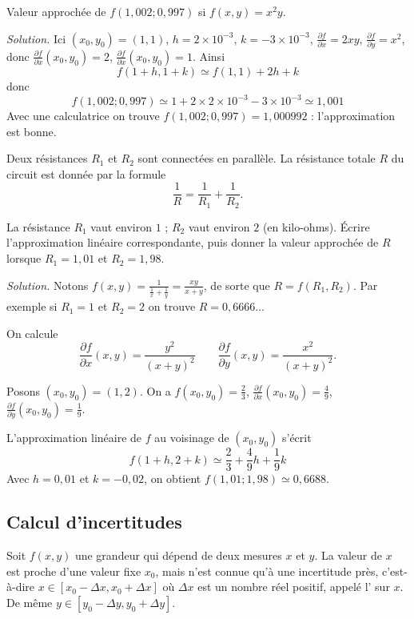 \documentclass[12pt, class=report,crop=false]{standalone}
\begin{document}
\begin{exemple}
Valeur approchée de $f(1,002 ; 0,997)$ si $f(x,y) = x^2y$.
\bigskip

\emph{Solution.}
Ici $(x_0,y_0) = (1,1)$, $h = 2 \times 10^{-3}$, $k = -3 \times 10^{-3}$,
$\frac{\partial f}{\partial x} = 2xy$, $\frac{\partial f}{\partial y} = x^2$, donc $\frac{\partial f}{\partial x}(x_0,y_0) = 2$, $\frac{\partial f}{\partial x}(x_0,y_0) = 1$. Ainsi
$$f(1+h,1+k) \simeq f(1,1) + 2h + k$$
donc 
$$f(1,002 ; 0,997) \simeq 1 + 2 \times 2 \times 10^{-3} - 3 \times 10^{-3} \simeq 1,001$$
Avec une calculatrice on trouve $f(1,002 ; 0,997) = 1,000992$ : l'approximation est bonne.
\end{exemple}

\begin{exemple}
Deux résistances $R_1$ et $R_2$ sont connectées en parallèle. La résistance totale $R$ du circuit est donnée par la formule 
$$\frac{1}{R} = \frac{1}{R_1} + \frac{1}{R_2}.$$

La résistance $R_1$ vaut environ $1$ ; $R_2$ vaut environ $2$ (en kilo-ohms).
\'Ecrire l'approximation linéaire correspondante, puis donner la valeur approchée de $R$ lorsque $R_1 = 1,01$ et $R_2 = 1,98$.

\bigskip

\emph{Solution.}
Notons $f(x,y) = \frac{1}{\frac{1}{x} + \frac{1}{y}} = \frac{xy}{x+y}$, de sorte que $R = f(R_1,R_2)$.
Par exemple si $R_1 = 1$ et $R_2 = 2$ on trouve $R = 0,6666\ldots$


On calcule 
$$\frac{\partial f}{\partial x}(x,y) = \frac{y^2}{(x+y)^2} \qquad
\frac{\partial f}{\partial y}(x,y) = \frac{x^2}{(x+y)^2}.$$

Posons $(x_0,y_0)=(1,2)$. On a $f(x_0,y_0) = \frac 23$,
$\frac{\partial f}{\partial x}(x_0,y_0) = \frac 49$,
$\frac{\partial f}{\partial y}(x_0,y_0) = \frac 19$.

L'approximation linéaire de $f$ au voisinage de $(x_0,y_0)$ s'écrit
$$f(1+h,2+k) \simeq \frac 23 + \frac49 h + \frac19 k$$
Avec $h = 0,01$ et $k = -0,02$, on obtient
$f(1,01 ; 1,98) \simeq 0,6688$.
\end{exemple}


\subsection{Calcul d'incertitudes}


Soit $f(x,y)$ une grandeur qui dépend de deux mesures $x$ et $y$.
La valeur de $x$ est proche d'une valeur fixe $x_0$, mais n'est connue qu'à une incertitude près, c'est-à-dire $x \in [x_0-\Delta x,x_0 + \Delta x]$ où $\Delta x$ est un nombre réel positif, appelé l' sur $x$.
De même $y \in [y_0-\Delta y,y_0 + \Delta y]$.
\end{document}

